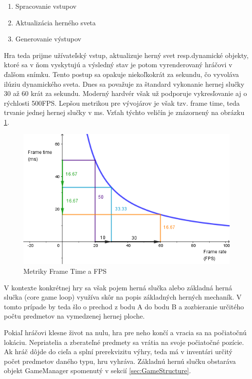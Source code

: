\documentclass[slovak, master]{diploma}
\begin{document}
\begin{enumerate}
  \item Spracovanie vstupov
  \item Aktualizácia herného sveta
  \item Generovanie výstupov
\end{enumerate}

Hra teda prijme užívateľský vstup, aktualizuje herný svet resp.dynamické objekty, ktoré sa v ňom vyskytujú a výsledný stav je potom vyrenderovaný hráčovi v ďalšom snímku. Tento postup sa opakuje niekoľkokrát za sekundu, čo vyvoláva ilúziu dynamického sveta. Dnes sa považuje za štandard vykonanie hernej slučky 30 až 60 krát za sekundu. Moderný hardvér však už podporuje vykresľovanie aj o rýchlosti 500FPS. Lepšou metrikou pre vývojárov je však tzv. frame time, teda trvanie jednej hernej slučky v ms. Vzťah týchto veličín je znázornený na obrázku \ref{pic:FrameTimeFPS}.

\begin{figure}[!htbp]
    \centering
    \includegraphics[width=.8\textwidth]{Figures/frameTimeVsFPS.png}
    \caption{Metriky Frame Time a FPS \cite{FrameTimeFPS}}
    \label{pic:FrameTimeFPS}
\end{figure}

V kontexte konkrétnej hry sa však pojem herná slučka alebo základná herná slučka (core game loop) využíva skôr na popis základných herných mechaník. V tomto prípade by teda šlo o prechod z bodu A do bodu B a zozbieranie určitého počtu predmetov na vymedzenej hernej ploche.

Pokiaľ hráčovi klesne život na nulu, hra pre neho končí a vracia sa na počiatočnú lokáciu. Nepriatelia a zberateľné predmety sa vrátia na svoje počiatočné pozície. Ak hráč dôjde do cieľa a splní prerekvizitu výhry, teda má v inventári určitý počet predmetov daného typu, hru vyhráva. Základnú hernú slučku obstaráva objekt GameManager spomenutý v sekcií \ref{sec:GameStructure}. 
\end{document}
